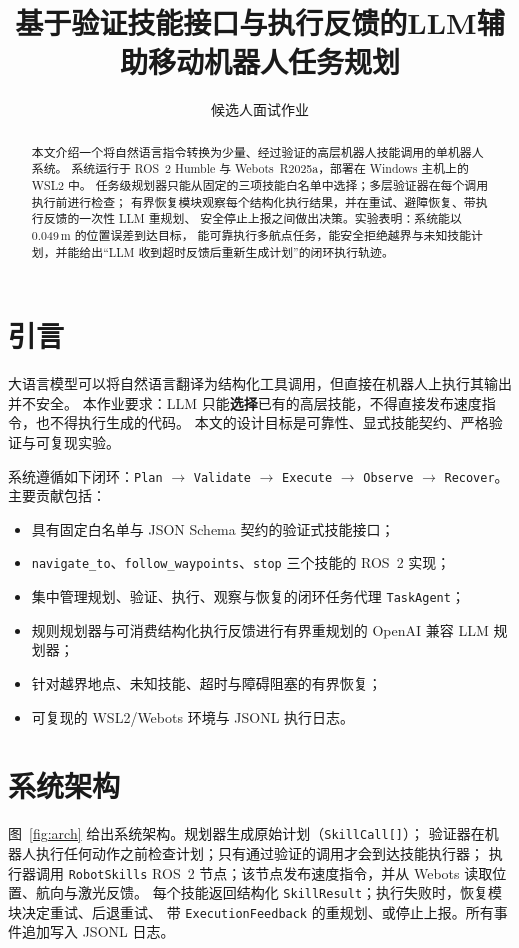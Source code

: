 \documentclass[10pt,twocolumn]{ctexart}
\title{\vspace{-1.2em}基于验证技能接口与执行反馈的LLM辅助移动机器人任务规划}
\author{候选人\small 面试作业}
\date{\vspace{-0.8em}}
\begin{document}
\maketitle

\begin{abstract}
本文介绍一个将自然语言指令转换为少量、经过验证的高层机器人技能调用的单机器人系统。
系统运行于 ROS~2 Humble 与 Webots~R2025a，部署在 Windows 主机上的 WSL2 中。
任务级规划器只能从固定的三项技能白名单中选择；多层验证器在每个调用执行前进行检查；
有界恢复模块观察每个结构化执行结果，并在重试、避障恢复、带执行反馈的一次性 LLM 重规划、
安全停止上报之间做出决策。实验表明：系统能以 0.049\,m 的位置误差到达目标，
能可靠执行多航点任务，能安全拒绝越界与未知技能计划，并能给出“LLM 收到超时反馈后重新生成计划”的闭环执行轨迹。
\end{abstract}

\section{引言}
\label{sec:intro}
大语言模型可以将自然语言翻译为结构化工具调用，但直接在机器人上执行其输出并不安全。
本作业要求：LLM 只能\textbf{选择}已有的高层技能，不得直接发布速度指令，也不得执行生成的代码。
本文的设计目标是可靠性、显式技能契约、严格验证与可复现实验。

系统遵循如下闭环：\texttt{Plan} $\rightarrow$ \texttt{Validate} $\rightarrow$
\texttt{Execute} $\rightarrow$ \texttt{Observe} $\rightarrow$ \texttt{Recover}。
主要贡献包括：
\begin{itemize}
  \item 具有固定白名单与 JSON Schema 契约的验证式技能接口；
  \item \texttt{navigate\_to}、\texttt{follow\_waypoints}、\texttt{stop} 三个技能的 ROS~2 实现；
  \item 集中管理规划、验证、执行、观察与恢复的闭环任务代理 \texttt{TaskAgent}；
  \item 规则规划器与可消费结构化执行反馈进行有界重规划的 OpenAI 兼容 LLM 规划器；
  \item 针对越界地点、未知技能、超时与障碍阻塞的有界恢复；
  \item 可复现的 WSL2/Webots 环境与 JSONL 执行日志。
\end{itemize}

\section{系统架构}
\label{sec:arch}
图~\ref{fig:arch} 给出系统架构。规划器生成原始计划（\texttt{SkillCall[]}）；
验证器在机器人执行任何动作之前检查计划；只有通过验证的调用才会到达技能执行器；
执行器调用 \texttt{RobotSkills} ROS~2 节点；该节点发布速度指令，并从 Webots 读取位置、航向与激光反馈。
每个技能返回结构化 \texttt{SkillResult}；执行失败时，恢复模块决定重试、后退重试、
带 \texttt{ExecutionFeedback} 的重规划、或停止上报。所有事件追加写入 JSONL 日志。
\end{document}

